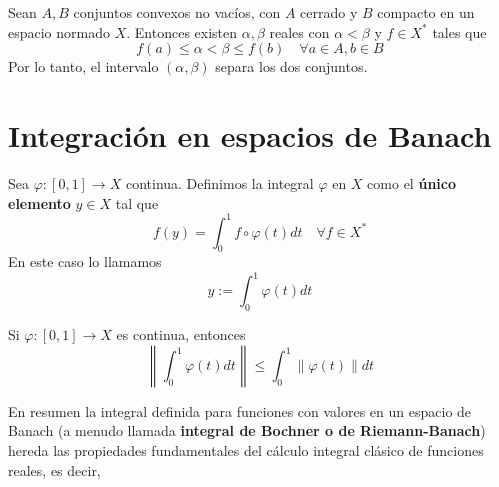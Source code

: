 \documentclass[12pt]{book}
\newcommand{\tbf}{\textbf}
\begin{document}
\begin{teo}\label{teo:hahn-banach-fuerte}
    Sean $A, B$ conjuntos convexos no vacíos, con $A$ cerrado y $B$ compacto en un espacio normado $X$. Entonces existen $\alpha, \beta$ reales con $\alpha < \beta$ y $f \in X^*$ tales que
    \begin{equation*}
        f(a) \leq \alpha < \beta \leq f(b) \quad \forall a \in A, b \in B
    \end{equation*}
    Por lo tanto, el intervalo $(\alpha, \beta)$ separa los dos conjuntos.
\end{teo}

\section{Integración en espacios de Banach}

\begin{definicion}
    Sea $\varphi: [0, 1] \to X$ continua. Definimos la integral $\varphi$ en $X$ como el \tbf{único elemento} $y \in X$ tal que 
    $$f(y) = \int_{0}^{1} f \circ \varphi(t) dt \quad \forall f \in X^*$$
    En este caso lo llamamos 
    $$y := \int_{0}^{1} \varphi(t) dt$$
\end{definicion}


\begin{prop}
    Si $\varphi: [0, 1] \to X$ es continua, entonces 
    \begin{equation*}
        \left\| \int_{0}^{1} \varphi(t) dt \right\| \leq \int_{0}^{1} \|\varphi(t)\| dt
    \end{equation*}
\end{prop}


\noindent
En resumen la integral definida para funciones con valores en un espacio de Banach (a menudo llamada \tbf{integral de Bochner o de Riemann-Banach}) hereda las propiedades fundamentales del cálculo integral clásico de funciones reales, es decir, 
\end{document}
